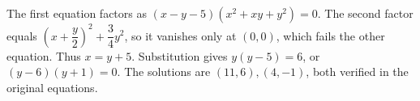 The first equation factors as $(x-y-5)(x^2+xy+y^2)=0$. The second factor equals $(x+\dfrac{y}{2})^2+\dfrac{3}{4}y^2$, so it vanishes only at $(0,0)$, which fails the other equation. Thus $x=y+5$. Substitution gives $y(y-5)=6$, or $(y-6)(y+1)=0$. The solutions are $\boxed{(11,6),(4,-1)}$, both verified in the original equations.
